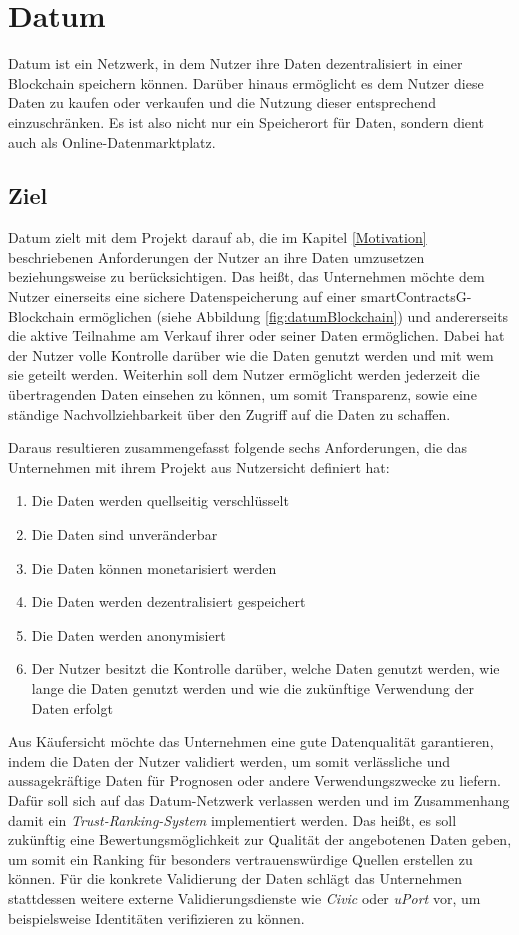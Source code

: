 \section{Datum}
Datum ist ein Netzwerk, in dem Nutzer ihre Daten dezentralisiert in einer Blockchain speichern können. Darüber hinaus ermöglicht es dem Nutzer diese Daten zu kaufen oder verkaufen und die Nutzung dieser entsprechend einzuschränken. Es ist also nicht nur ein Speicherort für Daten, sondern dient auch als Online-Datenmarktplatz.

\subsection{Ziel}
Datum zielt mit dem Projekt darauf ab, die im Kapitel \ref{Motivation} beschriebenen Anforderungen der Nutzer an ihre Daten umzusetzen beziehungsweise zu berücksichtigen. Das heißt, das Unternehmen möchte dem Nutzer einerseits eine sichere Datenspeicherung auf einer \gls{smartContractsG}-Blockchain ermöglichen (siehe Abbildung \ref{fig:datumBlockchain}) und andererseits die aktive Teilnahme am Verkauf ihrer oder seiner Daten ermöglichen. Dabei hat der Nutzer volle Kontrolle darüber wie die Daten genutzt werden und mit wem sie geteilt werden. Weiterhin soll dem Nutzer ermöglicht werden jederzeit die übertragenden Daten einsehen zu können, um somit Transparenz, sowie eine ständige Nachvollziehbarkeit über den Zugriff auf die Daten zu schaffen. \newline

\noindent Daraus resultieren zusammengefasst folgende sechs Anforderungen, die das Unternehmen mit ihrem Projekt aus Nutzersicht definiert hat:
\begin{enumerate}
	\item Die Daten werden quellseitig verschlüsselt
	\item Die Daten sind unveränderbar
	\item Die Daten können monetarisiert werden
	\item Die Daten werden dezentralisiert gespeichert
	\item Die Daten werden anonymisiert
	\item Der Nutzer besitzt die Kontrolle darüber, welche Daten genutzt werden, wie lange die Daten genutzt werden und wie die zukünftige Verwendung der Daten erfolgt 
\end{enumerate}

\noindent Aus Käufersicht möchte das Unternehmen eine gute Datenqualität garantieren, indem die Daten der Nutzer validiert werden, um somit verlässliche und aussagekräftige Daten für Prognosen oder andere Verwendungszwecke zu liefern. Dafür soll sich auf das Datum-Netzwerk verlassen werden und im Zusammenhang damit ein \textit{Trust-Ranking-System} implementiert werden. Das heißt, es soll zukünftig eine Bewertungsmöglichkeit zur Qualität der angebotenen Daten geben, um somit ein Ranking für besonders vertrauenswürdige Quellen erstellen zu können. Für die konkrete Validierung der Daten schlägt das Unternehmen stattdessen weitere externe Validierungsdienste wie \textit{Civic} oder \textit{uPort} vor, um beispielsweise Identitäten verifizieren zu können.

